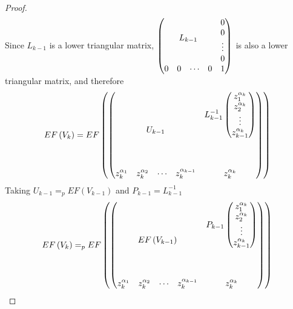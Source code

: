 \documentclass[11pt]{llncs}
\begin{document}
\begin{proof}
\begin{align*}
    \end{align*}
    Since $L_{k-1}$ is a lower triangular matrix, $ \begin{pmatrix}
            \multicolumn{4}{c}{\multirow{4}{*}{$L_{k-1}$}} & 0\\
            & & & & 0\\
            & & & & \vdots\\
            & & & & 0\\
            0 & 0& \cdots & 0 & 1
        \end{pmatrix}$ is also a lower triangular matrix, and therefore
     \begin{align*}
        EF\left(V_{k}\right) = 
        EF\left( 
        \begin{pmatrix}
            \multicolumn{4}{c}{\phantom{a}\multirow{4}{*}{$U_{k-1}$}\phantom{a}} & L_{k-1}^{-1}
            \begin{pmatrix}
                z_1^{\alpha_k}\\
                z_2^{\alpha_k}\\
                \vdots\\
                z_{k-1}^{\alpha_{k}}
            \end{pmatrix}\\
            \multicolumn{4}{c}{} & \\
            \multicolumn{4}{c}{} & \\
            \multicolumn{4}{c}{} & \\
            z_k^{\alpha_{1}} & z_k^{\alpha_{2}} & \cdots & z_{k}^{\alpha_{k-1}} & z_{k}^{\alpha_k}
        \end{pmatrix}
        \right)
    \end{align*}
    Taking $U_{k-1} =_p EF\left(V_{k-1}\right)$ and $P_{k-1} = L_{k-1}^{-1}$
    \begin{align*}
        EF\left(V_{k}\right) =_p 
        EF\left( 
        \begin{pmatrix}
            \multicolumn{4}{c}{\phantom{a}\multirow{4}{*}{$EF\left(V_{k-1}\right)$}\phantom{a}} & P_{k-1}
            \begin{pmatrix}
                z_1^{\alpha_k}\\
                z_2^{\alpha_k}\\
                \vdots\\
                z_{k-1}^{\alpha_{k}}
            \end{pmatrix}\\
            \multicolumn{4}{c}{} & \\
            \multicolumn{4}{c}{} & \\
            \multicolumn{4}{c}{} & \\
            z_k^{\alpha_{1}} & z_k^{\alpha_{2}} & \cdots & z_{k}^{\alpha_{k-1}} & z_{k}^{\alpha_k}
        \end{pmatrix}
        \right)
    \end{align*}
\end{proof}
\end{document}
